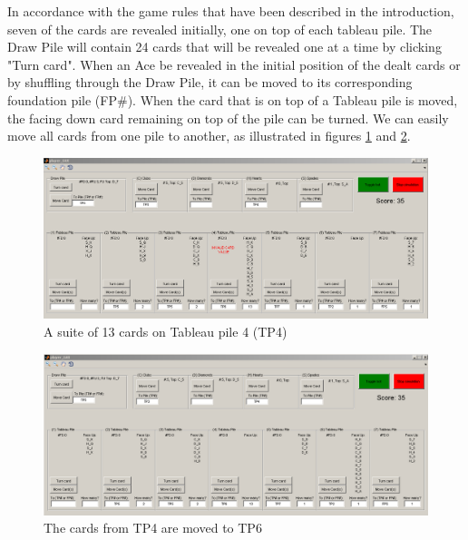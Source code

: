 \documentclass[runningheads,a4paper]{llncs}
\begin{document}
In accordance with the game rules that have been described in the introduction, seven of the cards are revealed initially, one on top of each tableau pile. The Draw Pile will contain 24 cards that will be revealed one at a time by clicking "Turn card".
When an Ace be revealed in the initial position of the dealt cards or by shuffling through the Draw Pile, it can be moved to its corresponding foundation pile (FP\#).
When the card that is on top of a Tableau pile is moved, the facing down card remaining on top of the pile can be turned. 
\newline
We can easily move all cards from one pile to another, as illustrated in figures \ref{fig:TP4full} and \ref{fig:TP6full}.
\begin{figure}
	\begin{center}
		\includegraphics[width=\textwidth]{images/moveMultiple_1}
		\caption{A suite of 13 cards on Tableau pile 4 (TP4)}
		\label{fig:TP4full}
	\end{center}
\end{figure}
\begin{figure}
 	\begin{center}
 		\includegraphics[width=\textwidth]{images/moveMultiple_2}
 		\caption{The cards from TP4 are moved to TP6}
 		\label{fig:TP6full}
 	\end{center}
 \end{figure}
\newline
\end{document}
